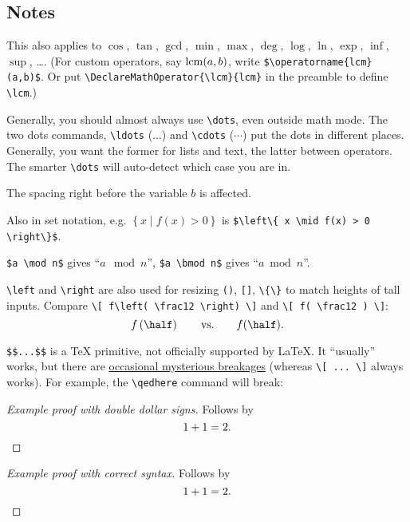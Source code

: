 \documentclass[10pt]{scrartcl}
\begin{document}
\subsection*{Notes}
\begin{enumerate}
  \ii \label{item:operator}
  This also applies to $\cos$, $\tan$, $\gcd$, $\min$, $\max$, $\deg$,
  $\log$, $\ln$, $\exp$, $\inf$, $\sup$, \dots.
  (For custom operators, say $\lcm(a,b)$, write \verb#$\operatorname{lcm}(a,b)$#.
  Or put \verb#\DeclareMathOperator{\lcm}{lcm}# in the preamble to define \verb#\lcm#.)

  \ii \label{item:dots}
  Generally, you should almost always use \verb#\dots#, even outside math mode.
  The two dots commands, \verb#\ldots# ($\ldots$) and \verb#\cdots# ($\cdots$) put the dots
  in different places.
  Generally, you want the former for lists and text, the latter between operators.
  The smarter \verb#\dots# will auto-detect which case you are in.

  \ii \label{item:comma}
  The spacing right before the variable $b$ is affected.

  \ii \label{item:mid}
  Also in set notation, e.g.
  $\left\{ x \mid f(x) > 0 \right\}$ is \verb#$\left\{ x \mid f(x) > 0 \right\}$#.

  \ii \label{item:mod}
  \verb#$a \mod n$# gives ``$a \mod n$'',
  \verb#$a \bmod n$# gives ``$a \bmod n$''.

  \ii \label{item:lr}
  \verb#\left# and \verb#\right# are also used for resizing
  \verb+()+, \verb+[]+, \verb+\{\}+ to match heights of tall inputs.
  Compare \verb+\[ f\left( \frac12 \right) \]+ and \verb+\[ f( \frac12 ) \]+:
  \[ f\left( \half \right) \qquad \text{vs.} \qquad f(\half) . \]

  \ii \label{item:display}
  \verb+$$...$$+ is a \TeX{} primitive, not officially supported by \LaTeX.
  It ``usually'' works, but there are
  \href{https://tex.stackexchange.com/q/503/76888}{occasional mysterious breakages}
  (whereas \verb#\[ ... \]# always works).
  For example, the \verb#\qedhere# command will break:
  \begin{proof}[Example proof with double dollar signs]
    Follows by $$1 + 1 = 2. \qedhere$$
  \end{proof}
  \begin{proof}[Example proof with correct syntax]
    Follows by \[ 1 + 1 = 2. \qedhere \]
  \end{proof}
\end{enumerate}

\end{document}
